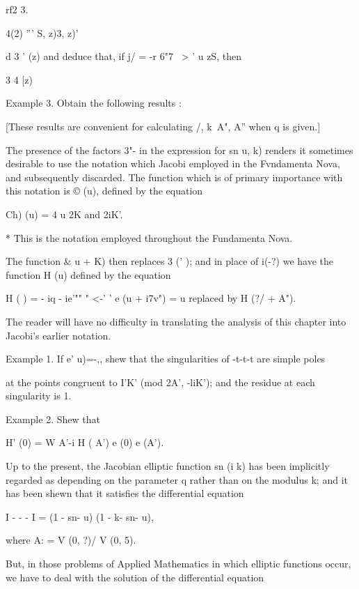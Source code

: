 rf2 3.

4(2) ''' S, z)3, z)'

d 3 ' (z) and deduce that, if j/ = -r 6"7 \ > ' u zS, then

 3 4 [z)

Example 3. Obtain the following results :

[These results are convenient for calculating /, k\ A", A'' when q is
given.]


The presence of the factors 3"- in the expression for sn u, k) renders
it sometimes desirable to use the notation which Jacobi employed in
the Fvndamenta Nova, and subsequently discarded. The function which is
of primary importance with this notation is © (u), defined by the
equation

Ch) (u) = 4 u%
2K and 2iK'.

* This is the notation employed throughout the Fundamenta Nova.

%
%

The function \& u + K) then replaces 3 (' ); and in place of i(-?) we
have the function H (u) defined by the equation

H ( ) = - iq - ie'"" " <-' ' e (u + i7v") = u%
replaced by H (?/ + A").

The reader will have no difficulty in translating the analysis of this
chapter into Jacobi's earlier notation.

Example 1. If e' u)=-,, shew that the singularities of -t-t-t are
simple poles

at the points congruent to I'K' (mod 2A', -liK'); and the residue at
each singularity is 1.

Example 2. Shew that

H' (0) = W A'-i H ( A') e (0) e (A').


Up to the present, the Jacobian elliptic function sn (i k) has been
implicitly regarded as depending on the parameter q rather than on the
modulus k; and it has been shewn that it satisfies the differential
equation

I - - - I = (1 - sn- u) (1 - k- sn- u),

where A: = V (0, ?)/ V (0, 5).

But, in those problems of Applied Mathematics in which elliptic
functions occur, we have to deal with the solution of the differential
equation

